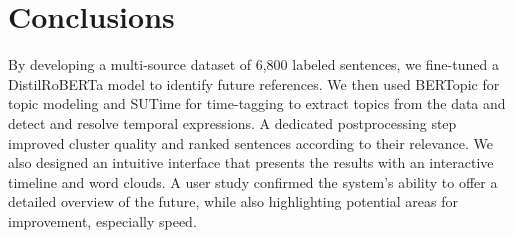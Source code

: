 \documentclass[sigconf]{acmart}
\begin{document}
\section{Conclusions}
By developing a multi-source dataset of 6,800 labeled sentences, we fine-tuned a DistilRoBERTa model to identify future references.  We then used BERTopic for topic modeling and SUTime for time-tagging to extract topics from the data and detect and resolve temporal expressions. A dedicated postprocessing step improved cluster quality and ranked sentences according to their relevance. We also designed an intuitive interface that presents the results with an interactive timeline and word clouds. A user study confirmed the system's ability to offer a detailed overview of the future, while also highlighting potential areas for improvement, especially speed.





\end{document}
